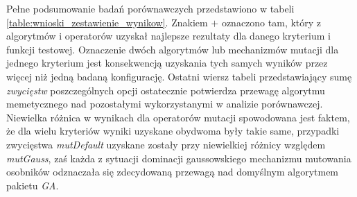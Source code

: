 \par
Pełne podsumowanie badań porównawczych przedstawiono w tabeli \ref{table:wnioski_zestawienie_wynikow}. Znakiem $+$ oznaczono tam, który z algorytmów i operatorów uzyskał najlepsze rezultaty dla danego kryterium i funkcji testowej. Oznaczenie dwóch algorytmów lub mechanizmów mutacji dla jednego kryterium jest konsekwencją uzyskania tych samych wyników przez więcej niż jedną badaną konfigurację. Ostatni wiersz tabeli przedstawiający sumę \emph{zwycięstw} poszczególnych opcji ostatecznie potwierdza przewagę algorytmu memetycznego nad pozostałymi wykorzystanymi w analizie porównawczej. Niewielka różnica w wynikach dla operatorów mutacji spowodowana jest faktem, że dla wielu kryteriów wyniki uzyskane obydwoma były takie same, przypadki zwycięstwa \emph{mutDefault} uzyskane zostały przy niewielkiej różnicy względem \emph{mutGauss}, zaś każda z sytuacji dominacji gaussowskiego mechanizmu mutowania osobników odznaczała się zdecydowaną przewagą nad domyślnym algorytmem pakietu \emph{GA}.
 


